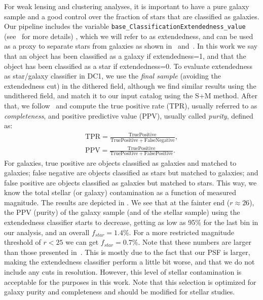 \documentclass[\docopts]{\docclass}
\begin{document}
For weak lensing and clustering analyses, it is important to have a pure galaxy sample and a good control over the fraction of stars that are classified as galaxies. Our pipeline includes the variable \texttt{base\_ClassificationExtendedness\_value} (see~\citet{2018PASJ...70S...5B} for more details) , which we will refer to as extendedness, and can be used as a proxy to separate stars from galaxies as shown in~\citet{2018PASJ...70S..25M} and~\citet{2018PASJ...70S...5B}. In this work we say that an object has been classified as a galaxy if extendedness=1, and that the object has been classified as a star if extendedness=0. To evaluate extendedness as star/galaxy classifier in DC1, we use the \textit{final sample} (avoiding the extendedness cut) in the dithered field, although we find similar results using the undithered field, and match it to our input catalog using the S+M method. After that, we follow~\citep{2018MNRAS.481.5451S} and compute the true positive rate (TPR), usually referred to as \textit{completeness}, and positive predictive value (PPV), usually called \textit{purity}, defined as:
\begin{eqnarray}
\mathrm{TPR} = \frac{\mathrm{True Positive}}{\mathrm{True Positive}+\mathrm{False Negative}}, \\
\mathrm{PPV} = \frac{\mathrm{True Positive}}{\mathrm{True Positive}+\mathrm{False Positive}}.
\end{eqnarray}
For galaxies, true positive are objects classified as galaxies and matched to galaxies; false negative are objects classified as stars but matched to galaxies; and false positive are objects classified as galaxies but matched to stars. This way, we know the total stellar (or galaxy) contamination as a function of measured magnitude. The results are depicted in . We see that at the fainter end ($r \approx 26$), the PPV (purity) of the galaxy sample (and of the stellar sample) using the extendedness classifier starts to decrease, getting as low as 95\% for the last bin in our analysis, and an overall $f_{star}=1.4\%$. For a more restricted magnitude threshold of $r < 25$ we can get $f_{star} = 0.7\%$. Note that these numbers are larger than those presented in~\citet{2018PASJ...70S..25M}. This is mostly due to the fact that our PSF is larger, making the extendedness classifier perform a little bit worse, and that we do not include any cuts in resolution. However, this level of stellar contamination is acceptable for the purposes in this work. Note that this selection is optimized for galaxy purity and completeness and should be modified for stellar studies.
\end{document}
